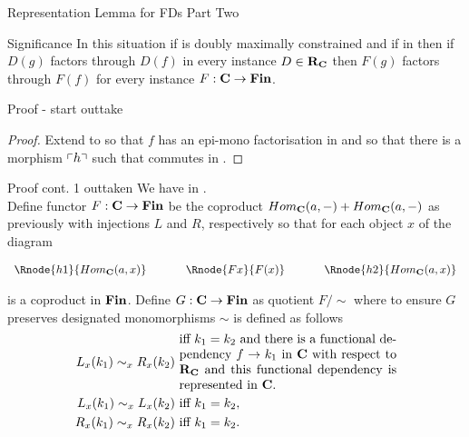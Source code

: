 \begin{frame}{Representation Lemma for FDs Part Two}{\slidecontext}
\representationLemmaPartTwo
\end{frame}

\begin{frame}{Significance}
In this situation if \catcw is doubly maximally constrained 
and if \scalebox{0.9}{\fgsourcediagram} in \catcw
then if $D(g)$ factors through
$D(f)$ in every instance $D \in \textbf{R}_{\textbf{C}}$  then   
$F(g)$ factors through
$F(f)$ for every instance $F: \textbf{C} \rightarrow \textbf{Fin}$. 
\end{frame}

\begin{frame} {Proof - start outtake}
\begin{proof} Extend \catcw to \catcpw so that $f$ has an epi-mono factorisation in \catcpw
and so that there  is a morphism $\left\ulcorner h\right\urcorner$ such that
commutes in \catcp.  
\end{proof}
\end{frame}

\begin{frame}{Proof cont. 1 outtaken}
We have \fgsourcediagram in \catc. \\
\medskip
Define functor $F: \textbf{C} \rightarrow \textbf{Fin}$ be the coproduct $Hom_{\textbf{C}}(a,-) + Hom_{\textbf{C}}(a,-)$
as previously with injections $L$ and $R$, respectively so that
for each object $x$ of \catcw the diagram
\begin{center}
$
\begin{array}{c p{0.5cm} c p{0.5cm} c  }
\Rnode{h1}{Hom_{\catc}(a,x)}  &&\Rnode{Fx}{F(x)}  &&   \Rnode{h2}{Hom_{\catc}(a,x)}       
\end{array} 
$
\end{center}
is a coproduct in $\textbf{Fin}$.
\medskip
Define $G: \textbf{C} \rightarrow \textbf{Fin}$ as quotient $F/\sim$ where 
to ensure $G$ preserves designated monomorphisms  $\sim$ is defined as follows
\begin{align*}
L_x(k_1) \sim_x R_x(k_2) & \mbox{ \parbox{6cm}{iff  $k_1=k_2$ and there is a functional dependency 
$f \morph k_1$ in \catcw with respect to $\reqtc$ and  this functional dependency is represented in \catc.}}\\
L_x(k_1) \sim_x L_x(k_2) & \mbox{ iff $k_1 = k_2$,} \\
R_x(k_1) \sim_x R_x(k_2) & \mbox{ iff $k_1 = k_2$.} \\
\end{align*} 
\end{frame}

